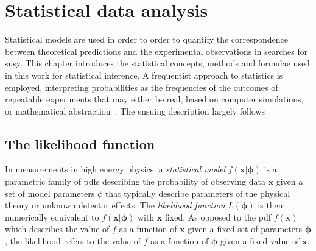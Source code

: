

\chapter{Statistical data analysis}\label{ch:statistics}

\ifpdf
    \graphicspath{{chapter-statistics/Figs/Raster/}{chapter-statistics/Figs/PDF/}{chapter-statistics/Figs/}}
\else
    \graphicspath{{chapter-statistics/Figs/Vector/}{chapter-statistics/Figs/}}
\fi


Statistical models are used in order to order to quantify the correspondence between theoretical predictions and the experimental observations in searches for \gls{susy}. This chapter introduces the statistical concepts, methods and formulae used in this work for statistical inference. A frequentist approach to statistics is employed, interpreting probabilities as the frequencies of the outcomes of repeatable experiments that may either be real, based on computer simulations, or mathematical abstraction~\cite{pdg2020,Cranmer:2015nia}. The ensuing description largely follows~\cite{Cranmer:2015nia, Cowan:2010js}

\section{The likelihood function}
 
In measurements in high energy physics, a \textit{statistical model} $f(\boldsymbol{x}\vert\boldsymbol{\phi})$ is a parametric family of \glspl{pdf} describing the probability of observing data $\boldsymbol{x}$ given a set of model parameters $\phi$ that typically describe parameters of the physical theory or unknown detector effects. The \textit{likelihood function} $L(\boldsymbol{\phi})$ is then numerically equivalent to $f(\boldsymbol{x}\vert\boldsymbol{\phi})$ with $\boldsymbol{x}$ fixed. As opposed to the \gls{pdf} $f(\boldsymbol{x})$ which describes the value of $f$ as a function of $\boldsymbol{x}$ given a fixed set of parameters $\boldsymbol{\phi}$, the likelihood refers to the value of $f$ as a function of $\boldsymbol{\phi}$ given a fixed value of $\boldsymbol{x}$.


